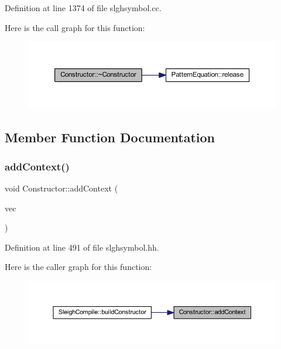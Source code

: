 Definition at line 1374 of file slghsymbol.\+cc.

Here is the call graph for this function\+:
\nopagebreak
\begin{figure}[H]
\begin{center}
\leavevmode
\includegraphics[width=350pt]{class_constructor_a7893d15db6b1fb50b277b99b872919ec_cgraph}
\end{center}
\end{figure}


\subsection{Member Function Documentation}
\mbox{\label{class_constructor_ab2969cbbef94e7c2760064cf11a4f827}} 
\subsubsection{\texorpdfstring{addContext()}{addContext()}}
{\footnotesize\ttfamily void Constructor\+::add\+Context (\begin{DoxyParamCaption}\item[{const vector$<$ \mbox{\hyperlink{class_context_change}{Context\+Change}} $\ast$ $>$ \&}]{vec }\end{DoxyParamCaption})\hspace{0.3cm}{\ttfamily [inline]}}



Definition at line 491 of file slghsymbol.\+hh.

Here is the caller graph for this function\+:
\nopagebreak
\begin{figure}[H]
\begin{center}
\leavevmode
\includegraphics[width=350pt]{class_constructor_ab2969cbbef94e7c2760064cf11a4f827_icgraph}
\end{center}
\end{figure}
\mbox{\label{class_constructor_a28952428d219c38b0dc2a8c800c2c96e}} 
